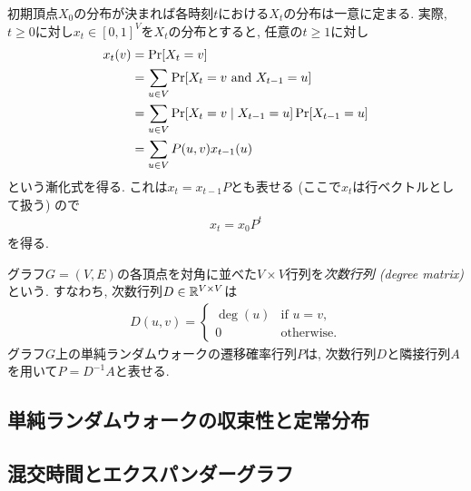 初期頂点$X_0$の分布が決まれば各時刻$t$における$X_t$の分布は一意に定まる.
実際, $t\ge 0$に対し$x_t \in [0,1]^{V}$を$X_t$の分布とすると, 任意の$t\ge 1$に対し
\begin{align*}
  x_t(v) &= \Pr\sbra*{X_t = v} \\
    &= \sum_{u\in V}\Pr\sbra*{ X_t = v \tand X_{t-1} = u} \\
    &= \sum_{u\in V}\Pr\sbra*{ X_t = v \condition X_{t-1} = u} \Pr\sbra*{X_{t-1} = u}  \\
    &= \sum_{u\in V} P(u,v) x_{t-1}(u)
\end{align*}
という漸化式を得る.
これは$x_{t} = x_{t-1} P$とも表せる (ここで$x_t$は行ベクトルとして扱う) ので
\begin{align}
  x_t = x_0 P^t \label{eq:x_t SRW}
\end{align}
を得る.

  グラフ$G=(V,E)$の各頂点を対角に並べた$V\times V$行列を\emph{次数行列 (degree matrix)}という.
  すなわち, 次数行列$D\in \mathbb{R}^{V\times V}$は
  \begin{align*}
    D(u,v) = \begin{cases}
      \deg(u)	& \text{if }u=v,\\
      0 & \text{otherwise}.
    \end{cases}
  \end{align*}
  グラフ$G$上の単純ランダムウォークの遷移確率行列$P$は, 次数行列$D$と隣接行列$A$を用いて$P=D^{-1}A$と表せる.

\subsection{単純ランダムウォークの収束性と定常分布}
\subsection{混交時間とエクスパンダーグラフ}